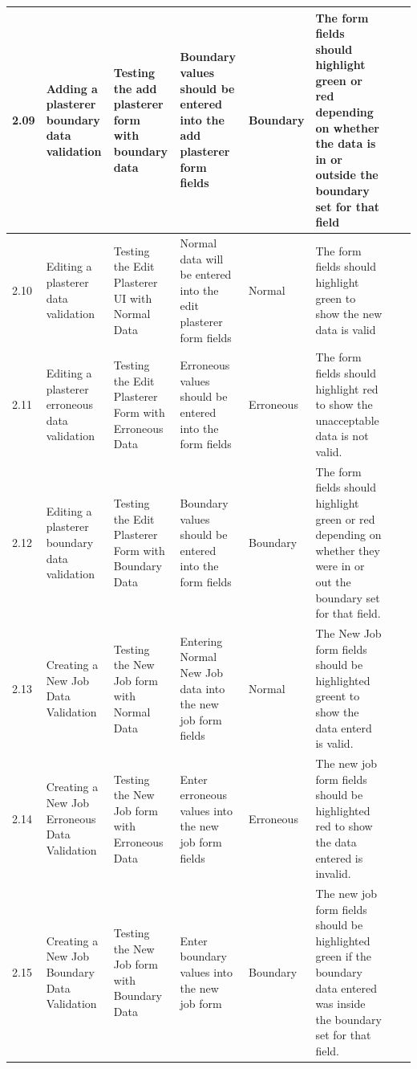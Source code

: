 \begin{landscape}
\begin{center}
\begin{longtable}{|p{1.5cm}|p{2.5cm}|p{2.5cm}|p{2cm}|p{2cm}|p{2cm}|p{2cm}|p{2cm}|}
	2.09 & Adding a plasterer boundary data validation & Testing the add plasterer form with boundary data & Boundary values should be entered into the add plasterer form fields & Boundary & The form fields should highlight green or red depending on whether the data is in or outside the boundary set for that field & & \\ \hline
	2.10 & Editing a plasterer data validation & Testing the Edit Plasterer UI with Normal Data & Normal data will be entered into the edit plasterer form fields & Normal & The form fields should highlight green to show the new data is valid & & \\ \hline
	2.11 & Editing a plasterer erroneous data validation & Testing the Edit Plasterer Form with Erroneous Data & Erroneous values should be entered into the form fields & Erroneous & The form fields should highlight red to show the unacceptable data is not valid. & & \\ \hline
	2.12 & Editing a plasterer boundary data validation & Testing the Edit Plasterer Form with Boundary Data & Boundary values should be entered into the form fields & Boundary & The form fields should highlight green or red depending on whether they were in or out the boundary set for that field. & & \\ \hline
	2.13 & Creating a New Job Data Validation & Testing the New Job form with Normal Data & Entering Normal New Job data into the new job form fields & Normal & The New Job form fields should be highlighted greent to show the data enterd is valid. & & \\ \hline
	2.14 & Creating a New Job Erroneous Data Validation & Testing the New Job form with Erroneous Data & Enter erroneous values into the new job form fields & Erroneous & The new job form fields should be highlighted red to show the data entered is invalid. & & \\ \hline
	2.15 & Creating a New Job Boundary Data Validation & Testing the New Job form with Boundary Data & Enter boundary values into the new job form & Boundary & The new job form fields should be highlighted green if the boundary data entered was inside the boundary set for that field. & & \\ \hline \hline



\end{longtable}
\end{center}
\end{landscape}
